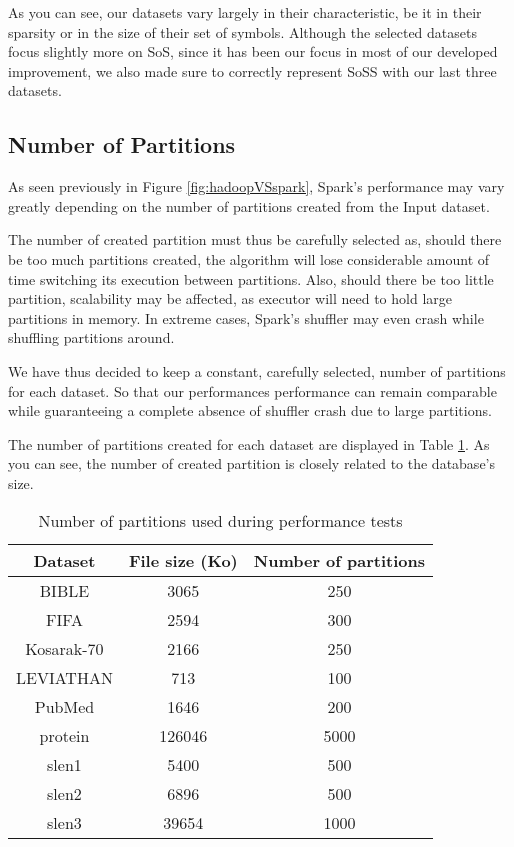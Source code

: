\documentclass{eplmastersthesis}
\begin{document}
As you can see, our datasets vary largely in their characteristic, be it in their sparsity or in the size of their set of symbols. Although the selected datasets focus slightly more on \acrlong{SoS}, since it has been our focus in most of our developed improvement, we also made sure to correctly represent \acrlong{SoSS} with our last three datasets. \newline

\subsection{Number of Partitions}

As seen previously in Figure \ref{fig:hadoopVSspark}, Spark's performance may vary greatly depending on the number of partitions created from the Input dataset.\newline

The number of created partition must thus be carefully selected as, should there be too much partitions created, the algorithm will lose considerable amount of time switching its execution between partitions. Also, should there be too little partition, scalability may be affected, as executor will need to hold large partitions in memory. In extreme cases, Spark's shuffler may even crash while shuffling partitions around. \newline

We have thus decided to keep a constant, carefully selected, number of partitions for each dataset. So that our performances performance can remain comparable while guaranteeing a complete absence of shuffler crash due to large partitions.\newline

The number of partitions created for each dataset are displayed in Table \ref{tab:numPartitions}. As you can see, the number of created partition is closely related to the database's size.

\begin{table}[h]
  \centering
  \begin{tabular}{| c | c | c |}
  	\hline
  	Dataset & File size (Ko) & Number of partitions \\
  	\hline
  	BIBLE & 3065 & 250 \\
  	\hline
  	FIFA & 2594 &300\\
  	\hline
  	Kosarak-70 & 2166 & 250\\
  	\hline  
  	LEVIATHAN & 713 & 100\\
  	\hline
  	PubMed & 1646 & 200\\
  	\hline
  	protein & 126046 & 5000\\
  	\hline
  	slen1 & 5400 & 500\\
 	\hline 
  	slen2 & 6896 & 500\\
  	\hline
  	slen3 & 39654 & 1000\\
  	\hline
  \end{tabular}
  \caption{Number of partitions used during performance tests}
  \label{tab:numPartitions}
\end{table}
\end{document}
